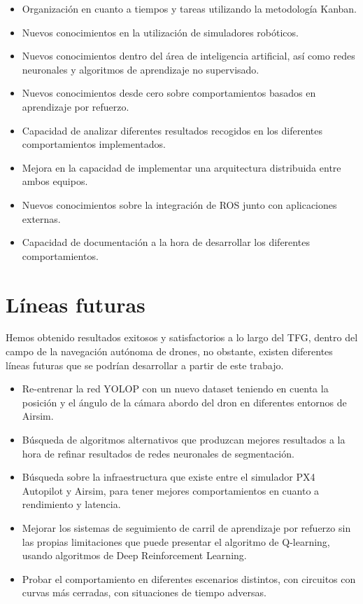 \begin{itemize}
    \item Organización en cuanto a tiempos y tareas utilizando la metodología Kanban.
    \item Nuevos conocimientos en la utilización de simuladores robóticos.
    \item Nuevos conocimientos dentro del área de inteligencia artificial, así como redes neuronales y algoritmos de
    aprendizaje no supervisado. 
    \item Nuevos conocimientos desde cero sobre comportamientos basados en aprendizaje por refuerzo.
    \item Capacidad de analizar diferentes resultados recogidos en los diferentes comportamientos implementados.
    \item Mejora en la capacidad de implementar una arquitectura distribuida entre ambos equipos.
    \item Nuevos conocimientos sobre la integración de ROS junto con aplicaciones externas.
    \item Capacidad de documentación a la hora de desarrollar los diferentes comportamientos. 
\end{itemize}

\section{Líneas futuras}
\label{lineas_futuras}
Hemos obtenido resultados exitosos y satisfactorios a lo largo del TFG, dentro del campo de la navegación autónoma de drones, no obstante, existen diferentes líneas futuras que se
podrían desarrollar a partir de este trabajo.

\begin{itemize}
\item Re-entrenar la red YOLOP con un nuevo dataset teniendo en cuenta la posición y el ángulo de la cámara abordo del dron en diferentes entornos de Airsim.
\item Búsqueda de algoritmos alternativos que produzcan mejores resultados a la hora de refinar resultados de redes neuronales de segmentación.
\item Búsqueda sobre la infraestructura que existe entre el simulador PX4 Autopilot y Airsim, para tener mejores
comportamientos en cuanto a rendimiento y latencia.
\item Mejorar los sistemas de seguimiento de carril de aprendizaje por refuerzo sin las propias limitaciones que puede
presentar el algoritmo de Q-learning, usando algoritmos de Deep Reinforcement Learning.
\item Probar el comportamiento en diferentes escenarios distintos, con circuitos con curvas más cerradas, con situaciones de tiempo
adversas. 
\end{itemize}
